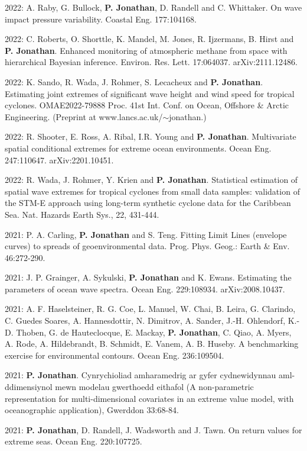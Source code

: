 \documentclass[11pt,a4paper]{moderncv}
\begin{document}
2022: A. Raby, G. Bullock, \textbf{P. Jonathan}, D. Randell and C. Whittaker. On wave impact pressure variability. Coastal Eng. 177:104168. 

2022: C. Roberts, O. Shorttle, K. Mandel, M. Jones, R. Ijzermans, B. Hirst and \textbf{P. Jonathan}. Enhanced monitoring of atmospheric methane from space with hierarchical Bayesian inference. Environ. Res. Lett. 17:064037. arXiv:2111.12486.

2022: K. Sando, R. Wada, J. Rohmer, S. Lecacheux and \textbf{P. Jonathan}. Estimating joint extremes of significant wave height and wind speed for tropical cyclones. OMAE2022-79888 Proc. 41st Int. Conf. on Ocean, Offshore \& Arctic Engineering. (Preprint at www.lancs.ac.uk/$\sim$jonathan.)

2022: R. Shooter, E. Ross, A. Ribal, I.R. Young and \textbf{P. Jonathan}. Multivariate spatial conditional extremes for extreme ocean environments. Ocean Eng. 247:110647. arXiv:2201.10451.

2022: R. Wada, J. Rohmer, Y. Krien and \textbf{P. Jonathan}. Statistical estimation of spatial wave extremes for tropical cyclones from small data samples: validation of the STM-E approach using long-term synthetic cyclone data for the Caribbean Sea. Nat. Hazards Earth Sys., 22, 431-444. 

2021: P. A. Carling, \textbf{P. Jonathan} and S. Teng. Fitting Limit Lines (envelope curves) to spreads of geoenvironmental data. Prog. Phys. Geog.: Earth \& Env. 46:272-290.

2021: J. P. Grainger, A. Sykulski, \textbf{P. Jonathan} and K. Ewans. Estimating the parameters of ocean wave spectra. Ocean Eng. 229:108934. arXiv:2008.10437.

2021: A. F. Haselsteiner, R. G. Coe, L. Manuel, W. Chai, B. Leira, G. Clarindo, C. Guedes Soares, A. Hannesdottir, N. Dimitrov, A. Sander, J.-H. Ohlendorf, K.-D. Thoben, G. de Hauteclocque, E. Mackay, \textbf{P. Jonathan}, C. Qiao, A. Myers, A. Rode, A. Hildebrandt, B. Schmidt, E. Vanem, A. B. Huseby. A benchmarking exercise for environmental contours. Ocean Eng. 236:109504.

2021: \textbf{P. Jonathan}. Cynrychioliad amharamedrig ar gyfer cydnewidynnau aml-ddimensiynol mewn modelau gwerthoedd eithafol (A non-parametric representation for multi-dimensional covariates in an extreme value model, with oceanographic application), Gwerddon 33:68-84. 

2021: \textbf{P. Jonathan}, D. Randell, J. Wadsworth and J. Tawn. On return values for extreme seas. Ocean Eng. 220:107725.
\end{document}
